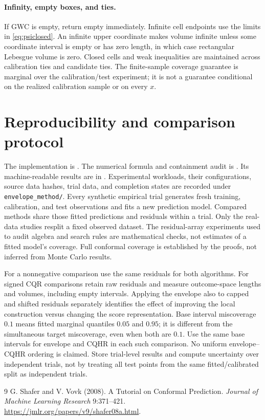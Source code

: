 \documentclass[11pt]{article}
\begin{document}
\paragraph{Infinity, empty boxes, and ties.}
If GWC is empty, return empty immediately. Infinite cell endpoints use the
limits in \eqref{eq:psiclosed}. An infinite upper coordinate makes volume
infinite unless some coordinate interval is empty or has zero length, in which
case rectangular Lebesgue volume is zero. Closed cells and weak inequalities
are maintained across calibration ties and candidate ties. The finite-sample
coverage guarantee is marginal over the calibration/test experiment; it is not
a guarantee conditional on the realized calibration sample or on every $x$.

\section{Reproducibility and comparison protocol}
The implementation is . The numerical formula and
containment audit is .
Its machine-readable results are in .
Experimental workloads,
their configurations, source data hashes, trial data, and completion states
are recorded under \texttt{envelope\_method/}. Every synthetic empirical trial
generates fresh training, calibration, and test observations and fits a new
prediction model. Compared methods share those fitted predictions and residuals
within a trial. Only the real-data studies resplit a fixed observed dataset.
The residual-array experiments used to audit algebra and search rules are
mathematical checks, not estimates of a fitted model's coverage. Full conformal
coverage is established by the proofs, not inferred from Monte Carlo results.

For a nonnegative comparison use the same residuals for both algorithms.
For signed CQR comparisons retain raw residuals and measure outcome-space
lengths and volumes, including empty intervals. Applying the envelope also to
capped and shifted residuals separately identifies the effect of improving the
local construction versus changing the score representation. Base interval
miscoverage $0.1$ means fitted marginal quantiles $0.05$ and $0.95$; it is
different from the simultaneous target miscoverage, even when both are $0.1$.
Use the same base intervals for envelope and CQHR in each such comparison.
No uniform envelope--CQHR ordering is claimed. Store trial-level results and
compute uncertainty over independent trials, not by treating all test points
from the same fitted/calibrated split as independent trials.

\begin{thebibliography}{9}
 G. Shafer and V. Vovk (2008).
A Tutorial on Conformal Prediction. \emph{Journal of Machine Learning Research}
9:371--421. \url{https://jmlr.org/papers/v9/shafer08a.html}.
\end{thebibliography}
\end{document}
